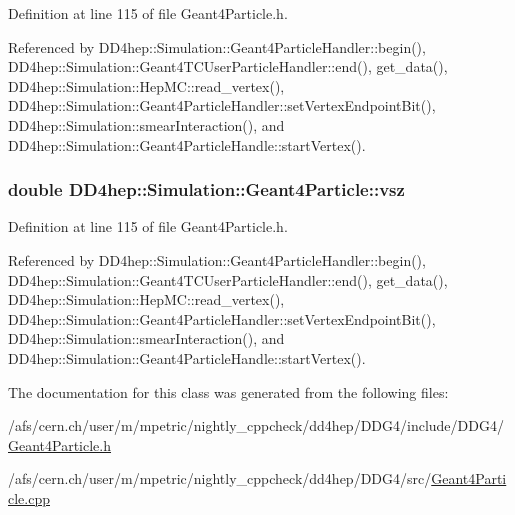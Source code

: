 Definition at line 115 of file Geant4Particle.h.

Referenced by DD4hep::Simulation::Geant4ParticleHandler::begin(), DD4hep::Simulation::Geant4TCUserParticleHandler::end(), get\_\-data(), DD4hep::Simulation::HepMC::read\_\-vertex(), DD4hep::Simulation::Geant4ParticleHandler::setVertexEndpointBit(), DD4hep::Simulation::smearInteraction(), and DD4hep::Simulation::Geant4ParticleHandle::startVertex().\hypertarget{class_d_d4hep_1_1_simulation_1_1_geant4_particle_aba9c37b5693ebe378cd17519228daa3d}{
\subsubsection[{vsz}]{\setlength{\rightskip}{0pt plus 5cm}double {\bf DD4hep::Simulation::Geant4Particle::vsz}}}
\label{class_d_d4hep_1_1_simulation_1_1_geant4_particle_aba9c37b5693ebe378cd17519228daa3d}


Definition at line 115 of file Geant4Particle.h.

Referenced by DD4hep::Simulation::Geant4ParticleHandler::begin(), DD4hep::Simulation::Geant4TCUserParticleHandler::end(), get\_\-data(), DD4hep::Simulation::HepMC::read\_\-vertex(), DD4hep::Simulation::Geant4ParticleHandler::setVertexEndpointBit(), DD4hep::Simulation::smearInteraction(), and DD4hep::Simulation::Geant4ParticleHandle::startVertex().

The documentation for this class was generated from the following files:\begin{DoxyCompactItemize}
\item 
/afs/cern.ch/user/m/mpetric/nightly\_\-cppcheck/dd4hep/DDG4/include/DDG4/\hyperlink{_geant4_particle_8h}{Geant4Particle.h}\item 
/afs/cern.ch/user/m/mpetric/nightly\_\-cppcheck/dd4hep/DDG4/src/\hyperlink{_geant4_particle_8cpp}{Geant4Particle.cpp}\end{DoxyCompactItemize}
